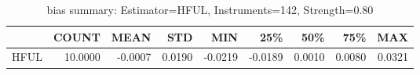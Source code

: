 \begin{table}[ht]
\centering
\caption{bias summary: Estimator=HFUL, Instruments=142, Strength=0.80}
\begin{tabular}{lrrrrrrrr}
\toprule
 & COUNT & MEAN & STD & MIN & 25\% & 50\% & 75\% & MAX \\
\midrule
HFUL & 10.0000 & -0.0007 & 0.0190 & -0.0219 & -0.0189 & 0.0010 & 0.0080 & 0.0321 \\
\bottomrule
\end{tabular}
\end{table}
